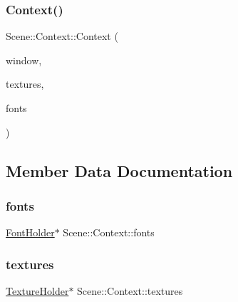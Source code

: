 \subsubsection{\texorpdfstring{Context()}{Context()}}
{\footnotesize\ttfamily Scene\+::\+Context\+::\+Context (\begin{DoxyParamCaption}\item[{sf\+::\+Render\+Window \&}]{window,  }\item[{\hyperlink{_resource_identifiers_8h_a96220f9135333a0209f9367a28b7da13}{Texture\+Holder} \&}]{textures,  }\item[{\hyperlink{_resource_identifiers_8h_ac2733d29d4a4d26a739742097fc51ede}{Font\+Holder} \&}]{fonts }\end{DoxyParamCaption})}



\subsection{Member Data Documentation}
\mbox{\label{struct_scene_1_1_context_ae8a09bf6b99a1081940f2f2d73db0272}} 
\subsubsection{\texorpdfstring{fonts}{fonts}}
{\footnotesize\ttfamily \hyperlink{_resource_identifiers_8h_ac2733d29d4a4d26a739742097fc51ede}{Font\+Holder}$\ast$ Scene\+::\+Context\+::fonts}

\mbox{\label{struct_scene_1_1_context_a6ec97ee92bfa4d09abc6edc9508d0050}} 
\subsubsection{\texorpdfstring{textures}{textures}}
{\footnotesize\ttfamily \hyperlink{_resource_identifiers_8h_a96220f9135333a0209f9367a28b7da13}{Texture\+Holder}$\ast$ Scene\+::\+Context\+::textures}

\mbox{\label{struct_scene_1_1_context_a4ea0d87e64ed3888a01bfb67e7ac1b84}} 
